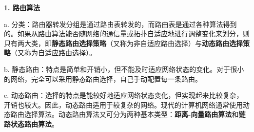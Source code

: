 {\textbf{1. 路由算法}}

{a.
分类：路由器转发分组}{是通过路由表转发的，而路由表是通过各种算法得到的。如果从路由算法能否随网络的通信量或拓扑自适应地进行调整变化来划分，则只有两大类，即}{\textbf{静态路由选择策略}}{（又称为非自适应路由选择）与}{\textbf{动态路由选择策略}}{（又称为自适应路由选择）。}

{b.
静态路由：特点}{是简单和开销小，但不能及时适应网络状态的变化。对于很小的网络，完全可以采用静态路由选择，自己手动配置每一条路由。}

{c.
动态路由：选择的特点}{是能较好地适应网络状态变化，但实现起来比较复杂，开销也较大。因此，动态路由适用于较复杂的网络。}{现代的计算机网络通常使用动态路由选择算法。}{动态路由算法又可分为两种基本类型：\textbf{距离-向量路由算法}和\textbf{链路状态路由算法}。}
